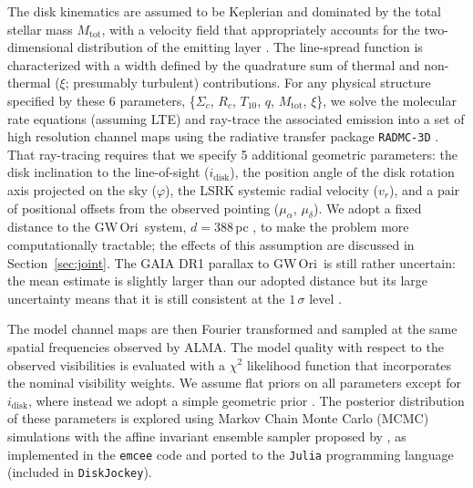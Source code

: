 \documentclass[twocolumn]{aastex61}
\newcommand{\obj}{GW\,Ori}
\begin{document}
The disk kinematics are assumed to be Keplerian and dominated by the total stellar mass $M_\mathrm{tot}$, with a velocity field that appropriately accounts for the two-dimensional distribution of the emitting layer \citep[see][]{rosenfeld13a}.  The  line-spread function is characterized with a width defined by the quadrature sum of thermal and non-thermal ($\xi$; presumably turbulent) contributions. For any physical structure specified by these 6 parameters, \{$\Sigma_c$, $R_c$, $T_{10}$, $q$, $M_\mathrm{tot}$, $\xi$\}, we solve the molecular rate equations (assuming LTE) and ray-trace the associated emission into a set of high resolution channel maps using the radiative transfer package {\tt RADMC-3D} \citep{dullemond12}. That ray-tracing requires that we specify 5 additional geometric parameters: the disk inclination to the line-of-sight ($i_\mathrm{disk}$), the position angle of the disk rotation axis projected on the sky ($\varphi$), the LSRK systemic radial velocity ($v_r$), and a pair of positional offsets from the observed pointing ($\mu_\alpha$, $\mu_\delta$). We adopt a fixed distance to the \obj\ system, $d = 388\,$pc \citep{kounkel17}, to make the problem more computationally tractable; the effects of this assumption are discussed in Section~\ref{sec:joint}. The GAIA DR1 parallax to \obj\ is still rather uncertain: the mean estimate is slightly larger than our adopted distance but its large uncertainty means that it is still consistent at the $1\,\sigma$ level \citep[$\pi = 2.1 \pm0.5\,$mas;][]{gaia16}.

The model channel maps are then Fourier transformed and sampled at the same spatial frequencies observed by ALMA. The model quality with respect to the observed visibilities is evaluated with a $\chi^2$ likelihood function that incorporates the nominal visibility weights. We assume flat priors on all parameters except for $i_\mathrm{disk}$, where instead we adopt a simple geometric prior \citep[the disk angular momentum vector is distributed uniformly on a sphere; e.g.,][]{czekala16}. The posterior distribution of these parameters is explored using Markov Chain Monte Carlo (MCMC) simulations with the affine invariant ensemble sampler proposed by \citet{goodman10}, as implemented in the {\tt emcee} code \citep{foreman-mackey13} and ported to the {\tt Julia} programming language (included in {\tt DiskJockey}).
\end{document}
